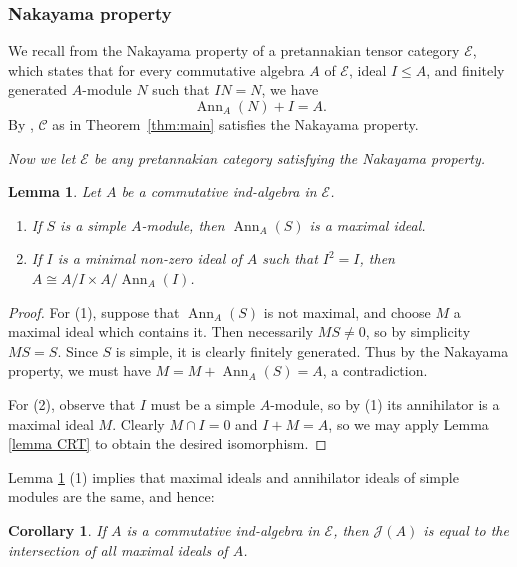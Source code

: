 \documentclass[11pt]{amsart}
\def\Cs{\mathscr{C}}
\def\Es{\mathscr{E}}
\newtheorem{cor}[thm]{Corollary}
\newtheorem{lemma}[thm]{Lemma}
\theoremstyle{definition}
\theoremstyle{remark}
\numberwithin{equation}{section}
\begin{document}
\subsubsection{Nakayama property}\label{section nakayama} We recall from \cite[\S 6.1]{C1} the Nakayama property of a pretannakian tensor category $\mathscr{E}$, which states that for every commutative algebra $A$ of $\mathscr{E}$, ideal $I\leq A$, and finitely generated $A$-module $N$ such that $IN=N$, we have
\[
\operatorname{Ann}_A(N)+I=A.
\]
By \cite[Thm.~6.1.5]{C1}, $\Cs$ as in Theorem~\ref{thm:main} satisfies the Nakayama property.

\medskip

\emph{Now we let $\Es$ be any pretannakian category satisfying the Nakayama property.} 

\medskip

\begin{lemma}\label{lemma simples GR MN}
    Let $A$ be a commutative ind-algebra in $\Es$.
    \begin{enumerate}
        \item If $S$ is a simple $A$-module, then $\operatorname{Ann}_A(S)$ is a maximal ideal.
        \item If $I$ is a minimal non-zero ideal of $A$ such that $I^2=I$, then $A\cong A/I\times A/\operatorname{Ann}_A(I)$.
    \end{enumerate}
\end{lemma}

\begin{proof}
    For (1), suppose that $\operatorname{Ann}_A(S)$ is not maximal, and choose $M$ a maximal ideal which contains it.  Then necessarily $M S\neq 0$, so by simplicity $M S=S$.  Since $S$ is simple, it is clearly finitely generated.  Thus by the Nakayama property, we must have $M=M+\operatorname{Ann}_A(S)=A$, a contradiction.  

    For (2), observe that $I$ must be a simple $A$-module, so by (1) its annihilator is a maximal ideal $M$.  Clearly $M\cap I=0$ and $I+M=A$, so we may apply Lemma \ref{lemma CRT} to obtain the desired isomorphism.
\end{proof}

Lemma \ref{lemma simples GR MN} (1) implies that maximal ideals and annihilator ideals of simple modules are the same, and hence:
\begin{cor}\label{cor jacobson rad GR MN}
    If $A$ is a commutative ind-algebra in $\Es$, then $\mathcal{J}(A)$ is equal to the intersection of all maximal ideals of $A$.
\end{cor}
\end{document}
